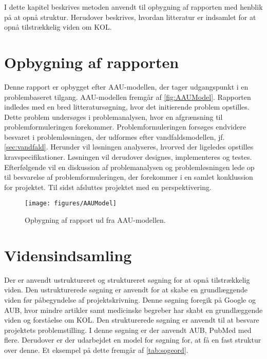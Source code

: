 I dette kapitel beskrives metoden anvendt til opbygning af rapporten med henblik på at opnå struktur. Herudover beskrives, hvordan litteratur er indsamlet for at opnå tilstrækkelig viden om KOL.

\section{Opbygning af rapporten}
Denne rapport er opbygget efter AAU-modellen, der tager udgangspunkt i en problembaseret tilgang. AAU-modellen fremgår af \autoref{fig:AAUModel}. Rapporten indledes med en bred litteratursøgning, hvor det initierende problem opstilles. Dette problem undersøges i problemanalysen, hvor en afgrænsning til problemformuleringen forekommer. Problemformuleringen forsøges endvidere besvaret i problemløsningen, der udformes efter vandfaldsmodellen, jf. \autoref{sec:vandfald}. Herunder vil løsningen analyseres, hvorved der ligeledes opstilles kravspecifikationer. Løsningen vil derudover designes, implementeres og testes. Efterfølgende vil en diskussion af problemanalysen og problemløsningen lede op til besvarelse af problemformuleringen, der forekommer i en samlet konklussion for projektet. Til sidst afsluttes projektet med en perspektivering.


\begin{figure} [H]
\centering
\texttt{[image: figures/AAUModel]}
\caption{Opbygning af rapport ud fra AAU-modellen.}
\label{fig:AAUModel}
\end{figure} 

\section{Vidensindsamling}
Der er anvendt ustruktureret og struktureret søgning for at opnå tilstrækkelig viden. Den ustrukturerede søgning er anvendt for at skabe en grundlæggende viden før påbegyndelse af projektskrivning. Denne søgning foregik på Google og AUB, hvor mindre artikler samt medicinske begreber har skabt en grundlæggende viden og forståelse om KOL. Den strukturerede søgning er anvendt til at besvare projektets problemstilling. I denne søgning er der anvendt AUB, PubMed med flere. Derudover er der udarbejdet en model for søgning for, at få en fast struktur over denne. Et eksempel på dette fremgår af \autoref{tab:sogeord}.

